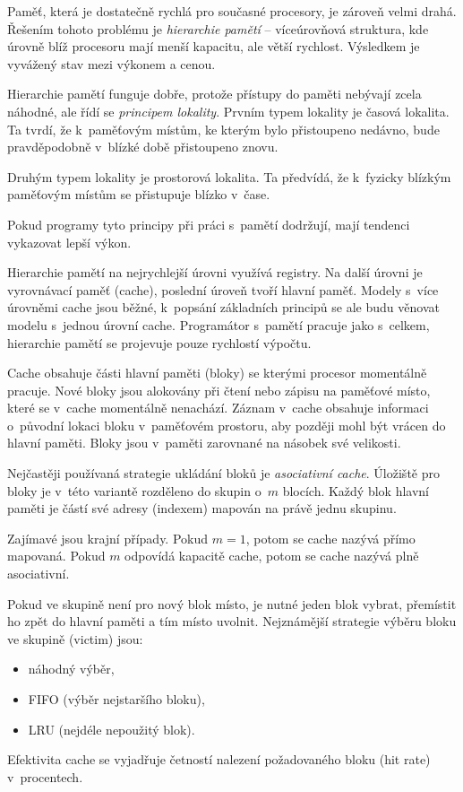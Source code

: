 Paměť, která je dostatečně rychlá pro současné procesory, je zároveň velmi drahá.
Řešením tohoto problému je \emph{hierarchie pamětí} -- víceúrovňová struktura, kde úrovně blíž procesoru mají menší kapacitu, ale větší rychlost.
Výsledkem je vyvážený stav mezi výkonem a cenou. \cite{avs}

Hierarchie pamětí funguje dobře, protože přístupy do paměti nebývají zcela náhodné, ale řídí se \emph{principem lokality}.
Prvním typem lokality je časová lokalita.
Ta tvrdí, že k~paměťovým místům, ke kterým bylo přistoupeno nedávno, bude pravděpodobně v~blízké době přistoupeno znovu.

Druhým typem lokality je prostorová lokalita.
Ta předvídá, že k~fyzicky blízkým paměťovým místům se přistupuje blízko v~čase.

Pokud programy tyto principy při práci s~pamětí dodržují, mají tendenci vykazovat lepší výkon.
\cite{QuantApproach}

Hierarchie pamětí na nejrychlejší úrovni využívá registry.
Na další úrovni je vyrovnávací paměť (cache), poslední úroveň tvoří hlavní paměť.
Modely s~více úrovněmi cache jsou běžné, k~popsání základních principů se ale budu věnovat modelu s~jednou úrovní cache.
Programátor s~pamětí pracuje jako s~celkem, hierarchie pamětí se projevuje pouze rychlostí výpočtu.

Cache obsahuje části hlavní paměti (bloky) se kterými procesor momentálně pracuje.
Nové bloky jsou alokovány při čtení nebo zápisu na paměťové místo, které se v~cache momentálně nenachází.
Záznam v~cache obsahuje informaci o~původní lokaci bloku v~paměťovém prostoru, aby později mohl být vrácen do hlavní paměti.
Bloky jsou v~paměti zarovnané na násobek své velikosti.

Nejčastěji používaná strategie ukládání bloků je \emph{asociativní cache}.
Úložiště pro bloky je v~této variantě rozděleno do skupin o~$m$ blocích.
Každý blok hlavní paměti je částí své adresy (indexem) mapován na právě jednu skupinu.

Zajímavé jsou krajní případy.
Pokud $m = 1$, potom se cache nazývá přímo mapovaná.
Pokud $m$ odpovídá kapacitě cache, potom se cache nazývá plně asociativní.

Pokud ve skupině není pro nový blok místo, je nutné jeden blok vybrat, přemístit ho zpět do hlavní paměti a tím místo uvolnit.
Nejznámější strategie výběru bloku ve skupině (victim) jsou:
\begin{itemize}
    \item náhodný výběr,
    \item FIFO (výběr nejstaršího bloku),
    \item LRU (nejdéle nepoužitý blok).
\end{itemize}
Efektivita cache se vyjadřuje četností nalezení požadovaného bloku (hit rate) v~procentech.

